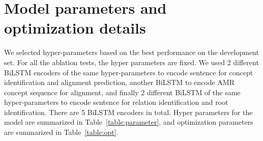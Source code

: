 \documentclass[11pt,a4paper]{article}
\begin{document}
\section{Model parameters and optimization details}
We selected hyper-parameters based on the best performance on the development set. For all the ablation tests, the hyper parameters are fixed. We used 2 different BiLSTM encoders of the same  hyper-parameters to encode sentence for concept identification and alignment prediction, another BiLSTM to encode AMR concept sequence for alignment, and finally 2 different BiLSTM of the same hyper-parameters to encode sentence for relation identification and root identification.  There are 5 BiLSTM encoders in total. Hyper parameters for the model are summarized in Table~\ref{table:parameter}, and optimization parameters are summarized in Table~\ref{table:opt}. 
\end{document}
